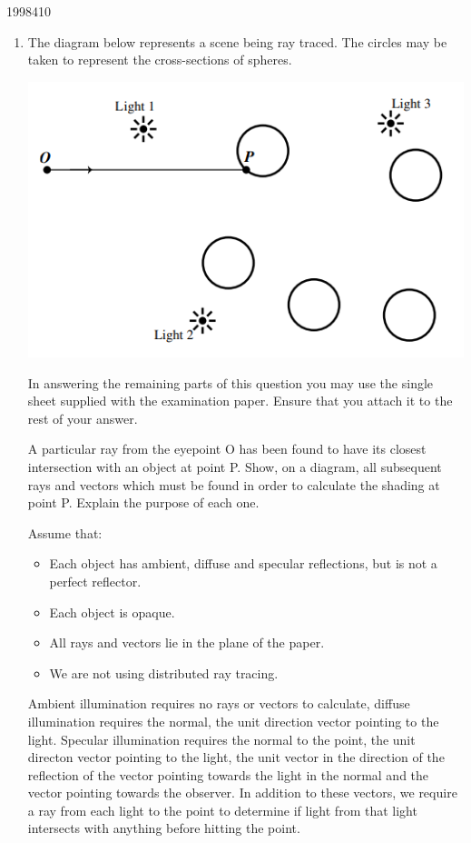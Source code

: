 \documentclass[10pt,\jkfside,a4paper]{article}
\begin{document}
\begin{enumerate}[label=(\alph*)]
\begin{examquestion}{1998}{4}{10}
\begin{enumerate}[label=(\alph*)]
\item The diagram below represents a scene being ray traced. The circles may be 
taken to represent the cross-sections of spheres.

\begin{center}
\includegraphics{diagram1998}
\end{center}

In answering the remaining parts of this question you may use the single sheet
supplied with the examination paper. Ensure that you attach it to the rest of your
answer.

A particular ray from the eyepoint O has been found to have its closest intersection
with an object at point P. Show, on a diagram, all subsequent rays and vectors
which must be found in order to calculate the shading at point P. Explain the
purpose of each one.

Assume that:

\begin{itemize}

\item Each object has ambient, diffuse and specular reflections, but is not a 
perfect reflector.

\item Each object is opaque.

\item All rays and vectors lie in the plane of the paper.

\item We are not using distributed ray tracing.

\end{itemize}

\vspace{1em}

Ambient illumination requires no rays or vectors to calculate, diffuse illumination requires the normal, 
the unit direction vector pointing to the light. Specular illumination requires the normal to the point, 
the unit directon vector pointing to the light, the unit vector in the direction of the reflection of the 
vector pointing towards the light in the normal and the vector pointing towards the observer.
In addition to these vectors, we require a ray from each light to the point to determine if light from 
that light intersects with anything before hitting the point.


\end{enumerate}
\end{examquestion}
\end{enumerate}
\end{document}
